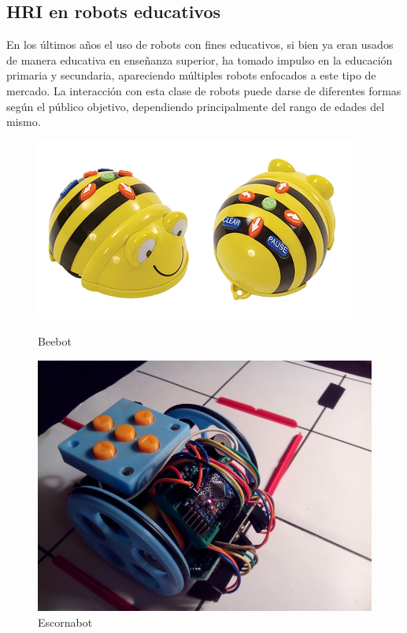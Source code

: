  \subsection{HRI en robots educativos}
 En  los últimos años el uso de robots con fines educativos, si bien ya eran usados de manera educativa en enseñanza superior, ha tomado impulso en la educación primaria y secundaria, apareciendo múltiples robots enfocados a este tipo de mercado. La interacción con esta clase de robots puede darse de diferentes formas según el público objetivo, dependiendo principalmente del rango de edades del mismo.

\begin{figure}
\centering
\begin{minipage}{0.45\textwidth}
\centering
\includegraphics[width=1\linewidth]{imagenes/beebot.png}
\caption{Beebot}
\label{fig:beebot}

\end{minipage}\hfill
\begin{minipage}{0.45\textwidth}
\centering
\includegraphics[width=1\linewidth]{imagenes/escornabot.jpg}

\caption{Escornabot}
\label{fig:escornabot}

\end{minipage}
\end{figure}


